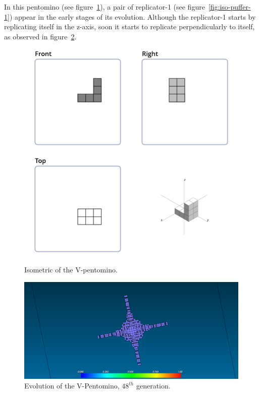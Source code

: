 In this pentomino (see figure~\ref{fig:iso-pent-v}), a pair of replicator-1 (see
figure~\ref{fig:iso-puffer-1}) appear in the early stages of its evolution.
Although the replicator-1 starts by replicating itself in the z-axis, soon it
starts to replicate perpendicularly to itself, as observed in
figure~\ref{fig:ss-pent:v-48}.

\begin{figure}
	\centering
	\includegraphics[scale=0.3]{iso_diagrams/v.png}
	\caption{Isometric of the V-pentomino.}
  \label{fig:iso-pent-v}
\end{figure}

\begin{figure}
	\centering
	\includegraphics[scale=0.3]{pentominoes_ss/v_48.png}
	\caption{Evolution of the V-Pentomino, $48^{th}$ generation.}
	\label{fig:ss-pent:v-48}
\end{figure}

